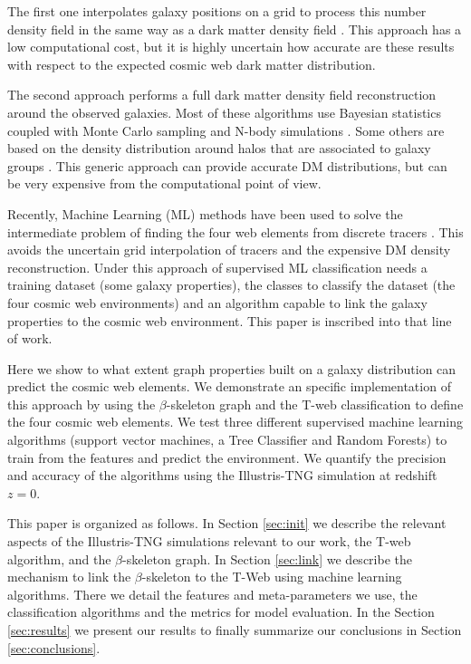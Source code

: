 \documentclass[usenatbib]{mnras}
\begin{document}
The first one interpolates galaxy positions on a grid to process
this number density field in the same way as a dark matter density
field \citep{Eardley2015,Alpaslan2016,Tojeiro2017,Shadab2019}.
This approach has a low computational cost, but it is highly uncertain
how accurate are these results with respect to the expected  cosmic
web dark matter distribution. 

The second approach performs a full dark matter density field
reconstruction around the observed galaxies.
Most of these algorithms use Bayesian statistics coupled with Monte
Carlo sampling  and N-body
simulations \citep{Jasche2010,Jasche2013a,Bos2014,LeclercqJasche2015,Horowitz2019,Burchett2020}. 
Some others are based on the density distribution around halos that
are associated to galaxy groups \citep{Wang2009,2011MNRAS.417.1303M}.  
This generic approach can provide accurate DM distributions, but can
be very expensive from the computational point of view. 

Recently, Machine Learning (ML) methods have been used to solve the
intermediate problem of finding the four web elements from discrete
tracers \citep{Hui2018}. 
This avoids the uncertain grid interpolation of tracers and the expensive
DM density reconstruction.
Under this approach of supervised ML classification needs a training
dataset (some galaxy properties), the classes to classify the dataset
(the four cosmic web environments) and an algorithm capable to link
the galaxy properties to the cosmic web environment.
This paper is inscribed into that line of work.


Here we show to what extent graph properties built on a galaxy
distribution can predict the cosmic web elements.
We demonstrate an specific implementation of this approach by using
the $\beta$-skeleton graph \citep{Fang2019} and the  T-web
\citep{Forero-Romero2009} classification to define the four cosmic web
elements.  
We test three different supervised machine learning
algorithms (support vector machines, a Tree Classifier and Random Forests) 
to train from the features and predict the environment.
We quantify the precision and accuracy of the algorithms using the
Illustris-TNG simulation \citep{Nelson2015} at redshift $z=0$. 

This paper is organized as follows. 
In Section \ref{sec:init} we describe the relevant aspects of the Illustris-TNG
simulations relevant to our work, the T-web algorithm,
and the $\beta$-skeleton graph.
In Section \ref{sec:link} we describe the mechanism to link the
$\beta$-skeleton to the T-Web using machine learning algorithms.
There we detail the features and meta-parameters we use, the
classification algorithms and the metrics for model evaluation.  
In the Section \ref{sec:results} we present our results
to finally summarize our conclusions in Section
\ref{sec:conclusions}. 
\end{document}

